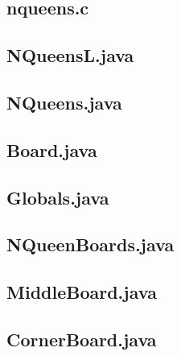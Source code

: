 \begin{landscape}
\tiny
\subsection{nqueens.c}\label{nqueenc}

\subsection{NQueensL.java}\label{nqueensl}

\subsection{NQueens.java}\label{nqueens}

\subsection{Board.java}\label{board}

\subsection{Globals.java}\label{globals}

\subsection{NQueenBoards.java}\label{nqueenboards}

\subsection{MiddleBoard.java}\label{middleboard}

\subsection{CornerBoard.java}\label{cornerboard}


\end{landscape}
